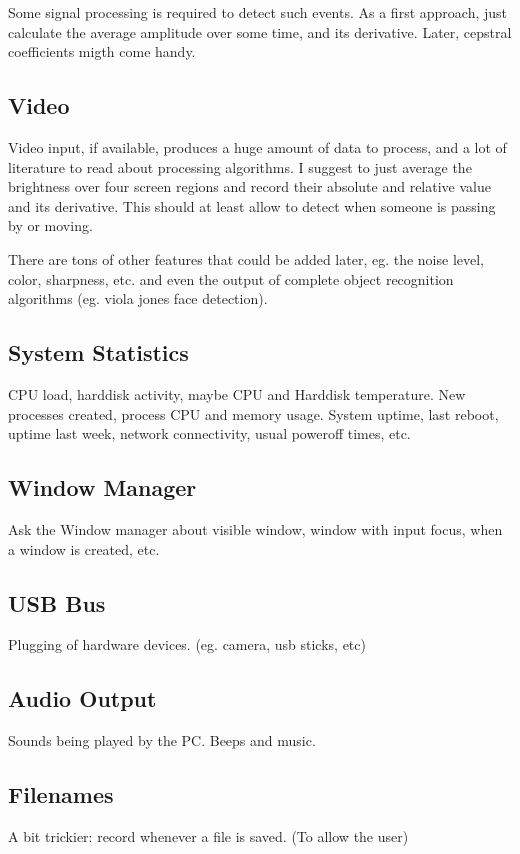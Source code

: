 \documentclass[]{article}
\begin{document}
Some signal processing is required to detect such events. As a first
approach, just calculate the average amplitude over some time, and its
derivative. Later, cepstral coefficients migth come handy.

\subsection{Video}
Video input, if available, produces a huge amount of data to process,
and a lot of literature to read about processing algorithms.  I
suggest to just average the brightness over four screen regions and
record their absolute and relative value and its derivative. This
should at least allow to detect when someone is passing by or moving.

There are tons of other features that could be added later, eg. the
noise level, color, sharpness, etc. and even the output of complete
object recognition algorithms (eg. viola jones face detection).

\subsection{System Statistics}
CPU load, harddisk activity, maybe CPU and Harddisk temperature.  New
processes created, process CPU and memory usage. System uptime, last
reboot, uptime last week, network connectivity, usual poweroff times,
etc.

\subsection{Window Manager}
Ask the Window manager about visible window, window with input focus,
when a window is created, etc.

\subsection{USB Bus}
Plugging of hardware devices. (eg. camera, usb sticks, etc)

\subsection{Audio Output}
Sounds being played by the PC. Beeps and music.

\subsection{Filenames}
A bit trickier: record whenever a file is saved. (To allow the user)
\end{document}
